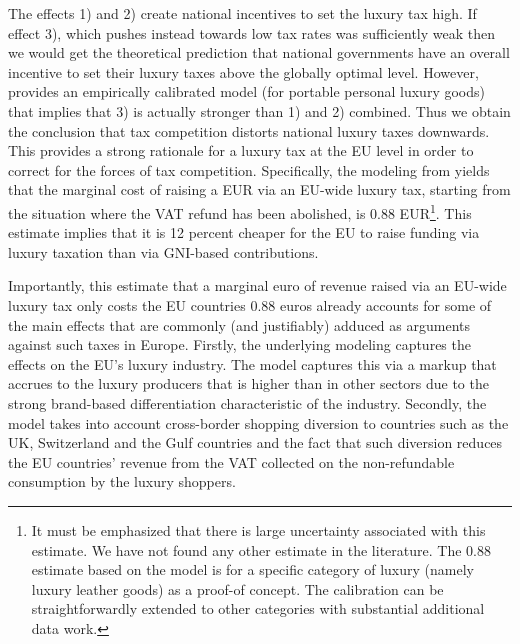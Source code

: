 \documentclass[../../main]{subfiles}
\begin{document}
The effects 1) and 2) create national incentives to set the luxury tax high. If effect 3), which pushes instead towards low tax rates was sufficiently weak then we would get the theoretical prediction that national governments have an overall incentive to set their luxury taxes above the globally optimal level. However,\citet{Xie2026} provides an empirically calibrated model (for portable personal luxury goods) that implies that 3) is actually stronger than 1) and 2) combined.  Thus we obtain the conclusion that tax competition distorts national luxury taxes downwards. This provides a strong rationale for a luxury tax at the EU level in order to correct for the forces of tax competition. Specifically, the modeling from \citet{Xie2026} yields that the marginal cost of raising a EUR via an EU-wide luxury tax, starting from the situation where the VAT refund has been abolished, is 0.88 EUR\footnote{It must be emphasized that there is large uncertainty associated with this estimate. We have not found any other estimate in the literature. The 0.88 estimate based on the model  \citet{Xie2026} is for a specific category of luxury (namely luxury leather goods) as a proof-of concept. The calibration can be straightforwardly extended to other categories with substantial additional data work.}. This estimate implies that it is 12 percent cheaper for the EU to raise funding via luxury taxation  than via GNI-based contributions. 

Importantly, this estimate that a marginal euro of revenue raised via an EU-wide luxury tax only costs the EU countries 0.88 euros already accounts for some of the main effects that are commonly (and justifiably) adduced as arguments against such taxes in Europe. Firstly, the underlying modeling captures the effects on the EU's luxury industry. The model captures this via a markup that accrues to the luxury producers that is higher than in other sectors due to the strong brand-based differentiation characteristic of the industry. 
Secondly, the model takes into account cross-border shopping diversion to countries such as the UK, Switzerland and the Gulf countries and the fact that such diversion reduces the EU countries' revenue from the VAT collected on the non-refundable consumption by the luxury shoppers.

\end{document}
